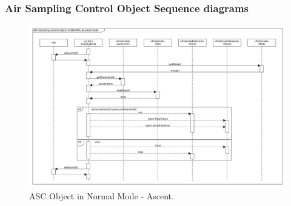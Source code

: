 \documentclass[a4paper,12pt,oneside]{article} %
\providecommand{\DIFaddbeginFL}{} %
\providecommand{\DIFaddendFL}{} %
\providecommand{\DIFdelbeginFL}{} %
\providecommand{\DIFdelendFL}{} %
\newcommand{\DIFscaledelfig}{0.5}
\newlength{\DIFdelgraphicswidth} %
\newlength{\DIFdelgraphicsheight} %
\newcommand{\DIFaddincludegraphics}[2][]{{\color{blue}\fbox{\DIFOincludegraphics[#1]{#2}}}} %
\newcommand{\DIFdelincludegraphics}[2][]{%
\sbox{\DIFdelgraphicsbox}{\DIFOincludegraphics[#1]{#2}}%
\settoboxwidth{\DIFdelgraphicswidth}{\DIFdelgraphicsbox} %
\settoboxtotalheight{\DIFdelgraphicsheight}{\DIFdelgraphicsbox} %
\scalebox{\DIFscaledelfig}{%
\parbox[b]{\DIFdelgraphicswidth}{\usebox{\DIFdelgraphicsbox}\\[-\baselineskip] \rule{\DIFdelgraphicswidth}{0em}}\llap{\resizebox{\DIFdelgraphicswidth}{\DIFdelgraphicsheight}{%
\setlength{\unitlength}{\DIFdelgraphicswidth}%
\begin{picture}(1,1)%
\thicklines\linethickness{2pt} %
{\color[rgb]{1,0,0}\put(0,0){\framebox(1,1){}}}%
{\color[rgb]{1,0,0}\put(0,0){\line( 1,1){1}}}%
{\color[rgb]{1,0,0}\put(0,1){\line(1,-1){1}}}%
\end{picture}%
}\hspace*{3pt}}} %
} %
\DeclareRobustCommand{\DIFaddbeginFL}{\DIFOaddbeginFL \let\includegraphics\DIFaddincludegraphics} %
\DeclareRobustCommand{\DIFaddendFL}{\DIFOaddendFL \let\includegraphics\DIFOincludegraphics} %
\DeclareRobustCommand{\DIFdelbeginFL}{\DIFOdelbeginFL \let\includegraphics\DIFdelincludegraphics} %
\DeclareRobustCommand{\DIFdelendFL}{\DIFOaddendFL \let\includegraphics\DIFOincludegraphics} %
\begin{document}
\begin{appendices}
\begin{landscape}
\subsubsection{Air Sampling Control Object Sequence diagrams}
\begin{figure}[H]
    \centering
    \DIFdelbeginFL %
\DIFdelendFL %
    \DIFaddbeginFL \includegraphics[height=0.75\textwidth]{appendix/img/softwareDiagrams/ASC-seq-dia-v1-3-ascent.jpg}
    \DIFaddendFL \caption{ASC Object in Normal Mode - Ascent.}
    \label{ASCa}
\end{figure}


\end{landscape}
\end{appendices}
\end{document}
